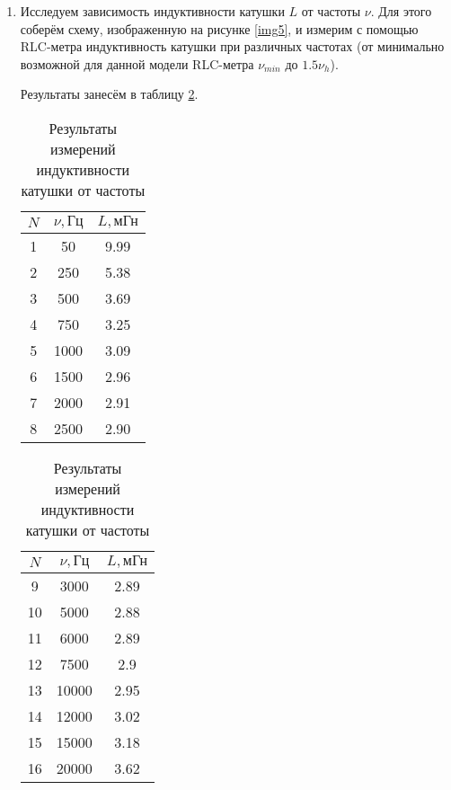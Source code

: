 \documentclass[a4paper,12pt]{article} %
\begin{document}
\begin{enumerate}
    \item Исследуем зависимость индуктивности катушки $L$ от частоты $\nu$. Для этого соберём схему, изображенную на рисунке \ref{img5}, и измерим с помощью RLC-метра индуктивность катушки при различных частотах (от минимально возможной для данной модели RLC-метра $\nu_{min}$ до $1.5 \nu_h$).

     Результаты занесём в таблицу \ref{tab4}.

    \begin{table}[h]
        \centering
        \begin{tabular}{|c|c|c|}
			\hline
                $N$ & $\nu, \text{Гц}$ &  $L, \text{мГн}$ \\ \hline
                1 & 50 & 9.99 \\ \hline
                2 & 250 & 5.38 \\ \hline
                3 & 500 & 3.69 \\ \hline
                4 & 750 & 3.25 \\ \hline
                5 & 1000 & 3.09 \\ \hline
                6 & 1500 & 2.96 \\ \hline
                7 & 2000 & 2.91 \\ \hline
                8 & 2500 & 2.90 \\ \hline
		\end{tabular}
            \hspace{.02\textwidth}
            \begin{tabular}{|c|c|c|}
			\hline
                $N$ & $\nu, \text{Гц}$ &  $L, \text{мГн}$ \\ \hline
                9 & 3000 & 2.89 \\ \hline
                10 & 5000 & 2.88 \\ \hline
                11 & 6000 & 2.89 \\ \hline
                12 & 7500 & 2.9 \\ \hline
                13 & 10000 & 2.95 \\ \hline
                14 & 12000 & 3.02 \\ \hline
                15 & 15000 & 3.18 \\ \hline
                16 & 20000 & 3.62 \\ \hline
		\end{tabular}
        \caption{Результаты измерений индуктивности катушки от частоты}
        \label{tab4}
    \end{table}
\end{enumerate}
\end{document}
